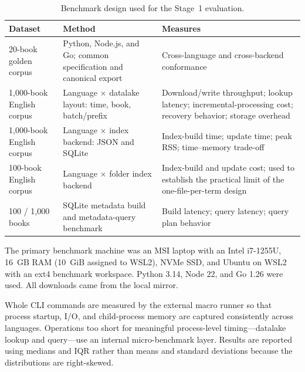 \documentclass[12pt,a4paper]{article}
\begin{document}
	\begin{table}[H]
		\centering
		\caption{Benchmark design used for the Stage~1 evaluation.}
		\label{tab:dataset-method-measures}
		\small
		\begin{tabularx}{\textwidth}{p{} X X}
			\toprule
			\textbf{Dataset} & \textbf{Method} & \textbf{Measures} \\
			\midrule
			
			20-book golden corpus
			&
			Python, Node.js, and Go; common specification and canonical export
			&
			Cross-language and cross-backend conformance
			\\[0.4em]
			
			1,000-book English corpus
			&
			Language $\times$ datalake layout: time, book, batch/prefix
			&
			Download/write throughput; lookup latency; incremental-processing cost;
			recovery behavior; storage overhead
			\\[0.4em]
			
			1,000-book English corpus
			&
			Language $\times$ index backend: JSON and SQLite
			&
			Index-build time; update time; peak RSS; time--memory trade-off
			\\[0.4em]
			
			100-book English corpus
			&
			Language $\times$ folder index backend
			&
			Index-build and update cost; used to establish the practical limit of
			the one-file-per-term design
			\\[0.4em]
			
			100 / 1,000 books
			&
			SQLite metadata build and metadata-query benchmark
			&
			Build latency; query latency; query plan behavior
			\\
			\bottomrule
		\end{tabularx}
	\end{table}
	
	The primary benchmark machine was an MSI laptop with an Intel i7-1255U, 16~GB RAM
	(10~GiB assigned to WSL2), NVMe SSD, and Ubuntu on WSL2 with an ext4 benchmark
	workspace. Python 3.14, Node 22, and Go 1.26 were used. All downloads came from the
	local mirror.
	
	Whole CLI commands are measured by the external macro runner so that process startup,
	I/O, and child-process memory are captured consistently across languages. Operations too
	short for meaningful process-level timing---datalake lookup and query---use an internal
	micro-benchmark layer. Results are reported using medians and IQR rather than means and
	standard deviations because the distributions are right-skewed.
	
\end{document}
